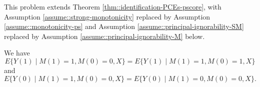 \begin{HomeworkProblem}\label{exr:26-2}



This problem extends Theorem \ref{thm::identification-PCEs-pscore}, with Assumption \ref{assume::strong-monotonicity} replaced by Assumption \ref{assume::monotonicity-ps} and Assumption \ref{assume::principal-ignorability-SM} replaced by Assumption \ref{assume::principal-ignorability-M} below.

\begin{assumption}
\label{assume::principal-ignorability-M}
We have
\[
E\{  Y(1) \mid M(1) = 1, M(0) =0, X \} = E\{  Y(1) \mid M(1) = 1, M(0) =1, X \}
\]
and
\[
E\{  Y(0) \mid M(1) = 1, M(0) =0, X \} = E\{  Y(0) \mid M(1) = 0, M(0) =0, X \}.
\]
\end{assumption}



\end{HomeworkProblem}
